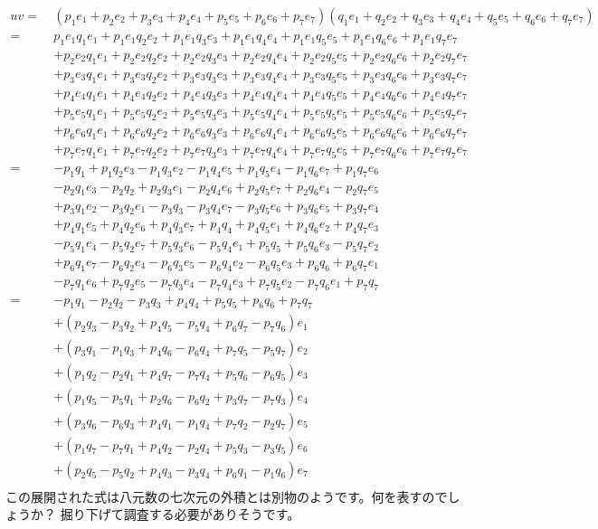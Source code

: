 \documentclass[a4paper,12pt,notitlepage]{jsreport}
\begin{document}
\begin{equation}
\begin{split}
uv=~&(p_1e_1+p_2e_2+p_3e_3+p_4e_4+p_5e_5+p_6e_6+p_7e_7)(q_1e_1+q_2e_2+q_3e_3+q_4e_4+q_5e_5+q_6e_6+q_7e_7)\\
=~&p_1e_1q_1e_1+p_1e_1q_2e_2+p_1e_1q_3e_3+p_1e_1q_4e_4+p_1e_1q_5e_5+p_1e_1q_6e_6+p_1e_1q_7e_7\\
&+p_2e_2q_1e_1+p_2e_2q_2e_2+p_2e_2q_3e_3+p_2e_2q_4e_4+p_2e_2q_5e_5+p_2e_2q_6e_6+p_2e_2q_7e_7\\
&+p_3e_3q_1e_1+p_3e_3q_2e_2+p_3e_3q_3e_3+p_3e_3q_4e_4+p_3e_3q_5e_5+p_3e_3q_6e_6+p_3e_3q_7e_7\\
&+p_4e_4q_1e_1+p_4e_4q_2e_2+p_4e_4q_3e_3+p_4e_4q_4e_4+p_4e_4q_5e_5+p_4e_4q_6e_6+p_4e_4q_7e_7\\
&+p_5e_5q_1e_1+p_5e_5q_2e_2+p_5e_5q_3e_3+p_5e_5q_4e_4+p_5e_5q_5e_5+p_5e_5q_6e_6+p_5e_5q_7e_7\\
&+p_6e_6q_1e_1+p_6e_6q_2e_2+p_6e_6q_3e_3+p_6e_6q_4e_4+p_6e_6q_5e_5+p_6e_6q_6e_6+p_6e_6q_7e_7\\
&+p_7e_7q_1e_1+p_7e_7q_2e_2+p_7e_7q_3e_3+p_7e_7q_4e_4+p_7e_7q_5e_5+p_7e_7q_6e_6+p_7e_7q_7e_7\\
=~&-p_1q_1+p_1q_2e_3-p_1q_3e_2-p_1q_4e_5+p_1q_5e_4-p_1q_6e_7+p_1q_7e_6\\
&-p_2q_1e_3-p_2q_2+p_2q_3e_1-p_2q_4e_6+p_2q_5e_7+p_2q_6e_4-p_2q_7e_5\\
&+p_3q_1e_2-p_3q_2e_1-p_3q_3-p_3q_4e_7-p_3q_5e_6+p_3q_6e_5+p_3q_7e_4\\
&+p_4q_1e_5+p_4q_2e_6+p_4q_3e_7+p_4q_4+p_4q_5e_1+p_4q_6e_2+p_4q_7e_3\\
&-p_5q_1e_4-p_5q_2e_7+p_5q_3e_6-p_5q_4e_1+p_5q_5+p_5q_6e_3-p_5q_7e_2\\
&+p_6q_1e_7-p_6q_2e_4-p_6q_3e_5-p_6q_4e_2-p_6q_5e_3+p_6q_6+p_6q_7e_1\\
&-p_7q_1e_6+p_7q_2e_5-p_7q_3e_4-p_7q_4e_3+p_7q_5e_2-p_7q_6e_1+p_7q_7\\
=~&-p_1q_1-p_2q_2-p_3q_3+p_4q_4+p_5q_5+p_6q_6+p_7q_7\\
&+(p_2q_3-p_3q_2+p_4q_5-p_5q_4+p_6q_7-p_7q_6)e_1\\
&+(p_3q_1-p_1q_3+p_4q_6-p_6q_4+p_7q_5-p_5q_7)e_2\\
&+(p_1q_2-p_2q_1+p_4q_7-p_7q_4+p_5q_6-p_6q_5)e_3\\
&+(p_1q_5-p_5q_1+p_2q_6-p_6q_2+p_3q_7-p_7q_3)e_4\\
&+(p_3q_6-p_6q_3+p_4q_1-p_1q_4+p_7q_2-p_2q_7)e_5\\
&+(p_1q_7-p_7q_1+p_4q_2-p_2q_4+p_5q_3-p_3q_5)e_6\\
&+(p_2q_5-p_5q_2+p_4q_3-p_3q_4+p_6q_1-p_1q_6)e_7\\
\end{split}
\end{equation}
この展開された式は八元数の七次元の外積とは別物のようです。何を表すのでしょうか？
掘り下げて調査する必要がありそうです。
\end{document}
